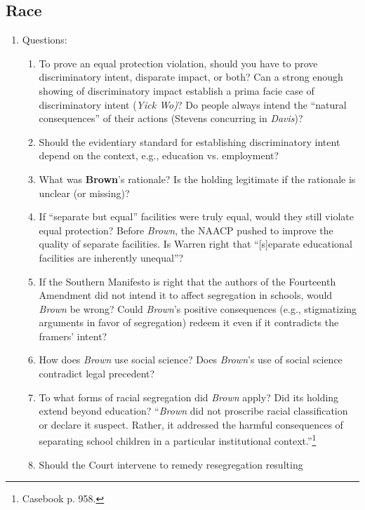 \subsection{Race}

\begin{enumerate}
    \item Questions:
    \begin{enumerate}
        \item To prove an equal protection violation, should you have to prove 
        discriminatory intent, disparate impact, or both? Can a strong enough 
        showing of discriminatory impact establish a prima facie case of 
        discriminatory intent (\emph{Yick Wo)}? Do people always intend the 
        ``natural consequences'' of their actions (Stevens concurring in 
        \emph{Davis})?
        \item Should the evidentiary standard for establishing discriminatory 
        intent depend on the context, e.g., education vs. employment?
        \item What was \textbf{Brown}'s rationale? Is the holding legitimate 
        if the rationale is unclear (or missing)?
        \item If ``separate but equal'' facilities were truly equal, would 
        they still violate equal protection? Before \emph{Brown}, the NAACP 
        pushed to improve the quality of separate facilities. Is Warren right 
        that ``[s]eparate educational facilities are inherently unequal''?
        \item If the Southern Manifesto is right that the authors of the 
        Fourteenth Amendment did not intend it to affect segregation in 
        schools, would \emph{Brown} be wrong? Could \emph{Brown}'s positive 
        consequences (e.g., stigmatizing arguments in favor of segregation) 
        redeem it even if it contradicts the framers' intent?
        \item How does \emph{Brown} use social science? Does \emph{Brown}'s 
        use of social science contradict legal precedent?
        \item To what forms of racial segregation did \emph{Brown} apply? Did 
        its holding extend beyond education? ``\emph{Brown} did not proscribe 
        racial classification or declare it suspect. Rather, it 
        addressed the harmful consequences of separating school children in a 
        particular institutional context.''\footnote{Casebook p. 958.}
        \item Should the Court intervene to remedy resegregation resulting 

\end{enumerate}
\end{enumerate}

